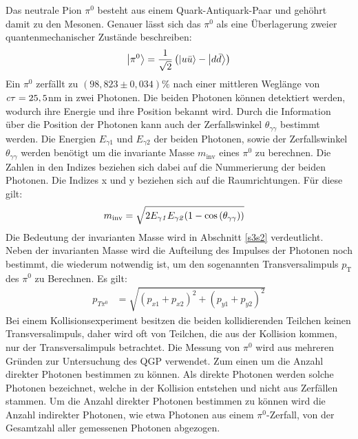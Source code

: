 Das neutrale Pion $\pi^{0}$ besteht aus einem Quark-Antiquark-Paar und geh\"ohrt damit zu den Mesonen.
Genauer l\"asst sich das $\pi^{0}$ als eine \"Uberlagerung zweier quantenmechanischer Zust\"ande beschreiben:
\begin{align}
\ket{\pi^{0}} = \frac{1}{\sqrt{2}}\left(\ket{u\bar{u}}-\ket{d\bar{d}}\right) \label{eq:pi0state}
\end{align}
Ein ${\pi^{0}}$ zerf{\"a}llt zu $\left( 98,823\pm0,034\right)\%$ nach einer mittleren Wegl\"ange von ${\it c\tau} = 25,5$nm \cite{book:pdg} in zwei Photonen.
Die beiden Photonen k\"onnen detektiert werden, wodurch ihre Energie und ihre Position bekannt wird.
Durch die Information \"uber die Position der Photonen kann auch der Zerfallswinkel $\theta_{\gamma\gamma}$ bestimmt werden.
Die Energien $E_{\gamma1}$ und $E_{\gamma2}$ der beiden Photonen, sowie der Zerfallswinkel $\theta_{\gamma\gamma}$ werden ben\"otigt um die invariante Masse $m_{\text{inv}}$ eines $\pi^{0}$ zu berechnen.
Die Zahlen in den Indizes beziehen sich dabei auf die Nummerierung der beiden Photonen. Die Indizes x und y beziehen sich auf die Raumrichtungen. F{\"u}r diese gilt:
\begin{align}
m_{\text{inv}} &= \sqrt{2E_{\gamma\it{1}}E_{\gamma\it{2}}(1-\cos\left( \theta_{\gamma\gamma}\right) )} \label{eq_invmass}
\end{align}
Die Bedeutung der invarianten Masse wird in Abschnitt \ref{s3s2} verdeutlicht.
\newline
Neben der invarianten Masse wird die Aufteilung des Impulses der Photonen noch bestimmt, die wiederum notwendig ist, um den sogenannten Transversalimpuls $p_\text{T}$ des $\pi^{0}$ zu Berechnen. Es gilt:
\begin{align}
p_{T\pi^{0}} &= \sqrt{\left(p_{x1}+p_{x2}\right)^{2} +\left(p_{y1}+p_{y2}\right)^{2}} \label{eq_pt}
\end{align}
Bei einem Kollisionsexperiment besitzen die beiden kollidierenden Teilchen keinen Transversalimpuls, daher wird oft von Teilchen, die aus der Kollision kommen, nur der Transversalimpuls betrachtet.
\newline
Die Messung von $\pi^{0}$ wird aus mehreren Gr\"unden zur Untersuchung des QGP verwendet.
Zum einen um die Anzahl direkter Photonen bestimmen zu k\"onnen.
Als direkte Photonen werden solche Photonen bezeichnet, welche in der Kollision entstehen und nicht aus Zerf\"allen stammen.
Um die Anzahl direkter Photonen bestimmen zu k\"onnen wird die Anzahl indirekter Photonen, wie etwa Photonen aus einem $\pi^{0}$-Zerfall, von der Gesamtzahl aller gemessenen Photonen abgezogen.
